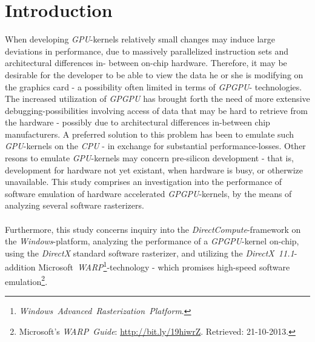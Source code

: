 \documentclass[fleqn,10pt]{SelfArx} %
\affiliation{EricNNilsson@gmail.com}
\newlength{\tocsep}
\begin{document}
\flushbottom %
\maketitle %
\thispagestyle{empty} %

\section*{Introduction} %
\label{sec:introduction}
When developing \textit{GPU}-kernels relatively small changes may induce large deviations in performance, due to massively parallelized instruction sets and architectural differences in-
between on-chip hardware. Therefore, it may be desirable for the developer to be able to view the data he or she is modifying on the graphics card - a possibility often limited in terms of \textit{GPGPU}-
technologies.\\
The increased utilization of \textit{GPGPU} has brought forth the need of more extensive debugging-possibilities involving access of data that may be hard to retrieve from the hardware - possibly due to architectural differences in-between chip manufacturers. A preferred solution to this problem has been to emulate such \textit{GPU}-kernels on the \textit{CPU} - in exchange for substantial performance-losses. Other resons to emulate \textit{GPU}-kernels may concern pre-silicon development - that is, development for hardware not yet existant, when hardware is busy, or otherwize unavailable. This study comprises an investigation into the performance of software emulation of hardware accelerated \textit{GPGPU}-kernels, by the means of analyzing several software rasterizers.\\
\\
Furthermore, this study concerns inquiry into the \textit{DirectCompute}-framework on the \textit{Windows}-platform, analyzing the performance of a \textit{GPGPU}-kernel on-chip, using the \textit{DirectX} standard software rasterizer, and utilizing the \textit{DirectX~11.1}-addition Microsoft~\textit{WARP}\footnote{\textit{Windows~Advanced~Rasterization~Platform}.}-technology - which promises high-speed software emulation\footnote{\label{lab:warpguide}Microsoft's \textit{WARP~Guide}: \url{http://bit.ly/19hiwrZ}. Retrieved: 21-10-2013.}. \\
\end{document}
